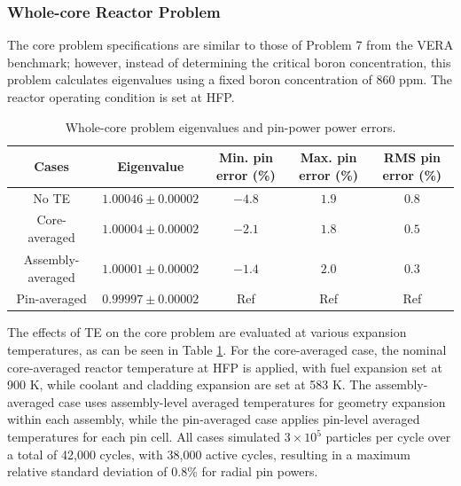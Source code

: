 \subsubsection{Whole-core Reactor Problem}

The core problem specifications are similar to those of Problem 7 from the VERA benchmark; however, instead of determining the critical boron concentration, this problem calculates eigenvalues using a fixed boron concentration of 860 ppm. The reactor operating condition is set at HFP.

\begin{table}
    \centering
    \caption{Whole-core problem eigenvalues and pin-power power errors.}
    \label{tab423} 
    \begin{adjustbox}{width=1.0\textwidth} %
    \begin{tabular}{| c | c | c | c | c |}
    \hline 
    Cases & Eigenvalue & Min. pin error (\%)  & Max. pin error (\%)  & RMS pin error (\%) \\
     \hline
     No TE                & $1.00046 \pm 0.00002$ & $-4.8$ & $1.9$ & $0.8$    \\ \hline
     Core-averaged        & $1.00004 \pm 0.00002$ & $-2.1$ & $1.8$ & $0.5$    \\ \hline
     Assembly-averaged    & $1.00001 \pm 0.00002$ & $-1.4$ & $2.0$ & $0.3$    \\ \hline
     Pin-averaged         & $0.99997 \pm 0.00002$ & Ref    & Ref   & Ref      \\ \hline
    \end{tabular}
    \end{adjustbox}
\end{table}

The effects of TE on the core problem are evaluated at various expansion temperatures, as can be seen in Table \ref{tab423}. For the core-averaged case, the nominal core-averaged reactor temperature at HFP is applied, with fuel expansion set at 900 K, while coolant and cladding expansion are set at 583 K. The assembly-averaged case uses assembly-level averaged temperatures for geometry expansion within each assembly, while the pin-averaged case applies pin-level averaged temperatures for each pin cell. All cases simulated $3\times10^5$ particles per cycle over a total of 42,000 cycles, with 38,000 active cycles, resulting in a maximum relative standard deviation of 0.8\% for radial pin powers.

